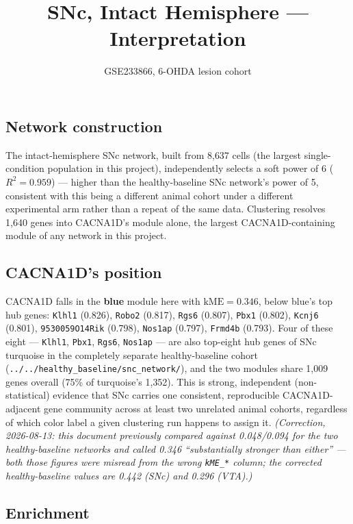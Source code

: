 \documentclass[11pt]{article}
\title{SNc, Intact Hemisphere --- Interpretation}
\author{GSE233866, 6-OHDA lesion cohort}
\date{}
\begin{document}
\maketitle

\subsection*{Network construction}

The intact-hemisphere SNc network, built from 8{,}637 cells (the largest
single-condition population in this project), independently selects a soft
power of 6 ($R^2 = 0.959$) --- higher than the healthy-baseline SNc network's
power of 5, consistent with this being a different animal cohort under a
different experimental arm rather than a repeat of the same data. Clustering
resolves 1{,}640 genes into CACNA1D's module alone, the largest
CACNA1D-containing module of any network in this project.

\subsection*{CACNA1D's position}

CACNA1D falls in the \textbf{blue} module here with $\mathrm{kME}=0.346$,
below blue's top hub genes: \texttt{Klhl1} (0.826), \texttt{Robo2} (0.817),
\texttt{Rgs6} (0.807), \texttt{Pbx1} (0.802), \texttt{Kcnj6} (0.801),
\texttt{9530059O14Rik} (0.798), \texttt{Nos1ap} (0.797), \texttt{Frmd4b}
(0.793). Four of these eight --- \texttt{Klhl1}, \texttt{Pbx1},
\texttt{Rgs6}, \texttt{Nos1ap} --- are also top-eight hub genes of SNc
turquoise in the completely separate healthy-baseline cohort
(\texttt{../../healthy\_baseline/snc\_network/}), and the two modules share
1{,}009 genes overall (75\% of turquoise's 1{,}352). This is strong,
independent (non-statistical) evidence that SNc carries one consistent,
reproducible CACNA1D-adjacent gene community across at least two unrelated
animal cohorts, regardless of which color label a given clustering run
happens to assign it.
\emph{(Correction, 2026-08-13: this document previously compared against
0.048/0.094 for the two healthy-baseline networks and called 0.346
``substantially stronger than either'' --- both those figures were misread
from the wrong \texttt{kME\_*} column; the corrected healthy-baseline
values are 0.442 (SNc) and 0.296 (VTA).)}

\subsection*{Enrichment}
\end{document}
